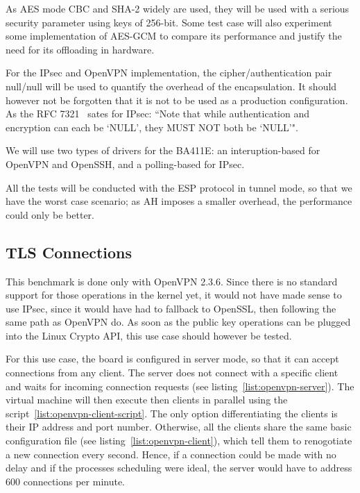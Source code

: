 \noindent As AES mode CBC and SHA-2 widely are used, they will be used with a serious security parameter using keys of 256-bit.
Some test case will also experiment some implementation of AES-GCM to compare its performance and justify the need for its offloading in hardware.

For the IPsec and OpenVPN implementation, the cipher/authentication pair null/null will be used to quantify the overhead of the encapsulation.
It should however not be forgotten that it is not to be used as a production configuration.
As the RFC 7321~\citep[pg. 7]{rfc7321} sates for IPsec: ``Note that while authentication and encryption can each
   be `NULL', they MUST NOT both be `NULL'".

We will use two types of drivers for the BA411E: an interuption-based for OpenVPN and OpenSSH, and a polling-based for IPsec.

All the tests will be conducted with the ESP protocol in tunnel mode, so that we have the worst case scenario; as AH imposes a smaller overhead, the performance could only be better.

\subsection{TLS Connections}
This benchmark is done only with OpenVPN 2.3.6.
Since there is no standard support for those operations in the kernel yet, it would not have made sense to use IPsec, since it would have had to fallback to OpenSSL, then following the same path as OpenVPN do.
As soon as the public key operations can be plugged into the Linux Crypto API, this use case should however be tested.

For this use case, the board is configured in server mode, so that it can accept connections from any client.
The server does not connect with a specific client and waits for incoming connection requests (see listing~\ref{list:openvpn-server}).
The virtual machine will then execute then clients in parallel using the script~\ref{list:openvpn-client-script}.
The only option differentiating the clients is their IP address and port number.
Otherwise, all the clients share the same basic configuration file (see listing~\ref{list:openvpn-client}), which tell them to renogotiate a new connection every second.
Hence, if a connection could be made with no delay and if the processes scheduling were ideal, the server would have to address 600 connections per minute.



